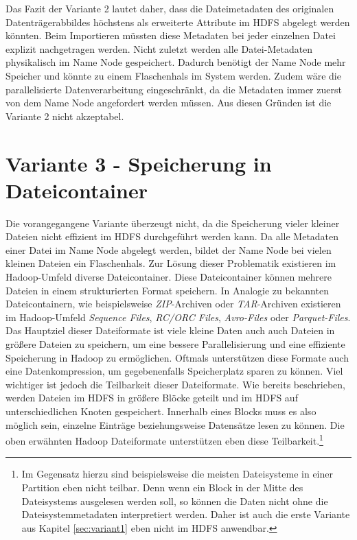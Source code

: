 \noindent
Das Fazit der Variante 2 lautet daher, dass die Dateimetadaten des originalen Datenträgerabbildes höchstens als erweiterte Attribute im HDFS abgelegt werden könnten. Beim Importieren müssten diese Metadaten bei jeder einzelnen Datei explizit nachgetragen werden. Nicht zuletzt werden alle Datei-Metadaten physikalisch im Name Node gespeichert. Dadurch benötigt der Name Node mehr Speicher und könnte zu einem Flaschenhals im System werden. Zudem wäre die parallelisierte Datenverarbeitung eingeschränkt, da die Metadaten immer zuerst von dem Name Node angefordert werden müssen. Aus diesen Gründen ist die Variante 2 nicht akzeptabel. 

\section{Variante 3 - Speicherung in Dateicontainer}

Die vorangegangene Variante überzeugt nicht, da die Speicherung vieler kleiner Dateien nicht effizient im HDFS durchgeführt werden kann. Da alle Metadaten einer Datei im Name Node abgelegt werden, bildet der Name Node bei vielen kleinen Dateien ein Flaschenhals. Zur Lösung dieser Problematik existieren im Hadoop-Umfeld diverse Dateicontainer. Diese Dateicontainer können mehrere Dateien in einem strukturierten Format speichern. In Analogie zu bekannten Dateicontainern, wie beispielsweise \textit{ZIP}-Archiven oder \textit{TAR}-Archiven existieren im Hadoop-Umfeld \textit{Sequence Files}, \textit{RC/ORC Files}, \textit{Avro-Files} oder \textit{Parquet-Files}.\cite[S. 296]{expert_hadoop_admin} \\
Das Hauptziel dieser Dateiformate ist viele kleine Daten auch auch Dateien in größere Dateien zu speichern, um eine bessere Parallelisierung und eine effiziente Speicherung in Hadoop zu ermöglichen. Oftmals unterstützen diese Formate auch eine Datenkompression, um gegebenenfalls Speicherplatz sparen zu können. Viel wichtiger ist jedoch die Teilbarkeit dieser Dateiformate. Wie bereits beschrieben, werden Dateien im HDFS in größere Blöcke geteilt und im HDFS auf unterschiedlichen Knoten gespeichert. Innerhalb eines Blocks muss es also möglich sein, einzelne Einträge beziehungsweise Datensätze lesen zu können. Die oben erwähnten Hadoop Dateiformate unterstützen eben diese Teilbarkeit.\footnote{Im Gegensatz hierzu sind beispielsweise die meisten Dateisysteme in einer Partition eben nicht teilbar. Denn wenn ein Block in der Mitte des Dateisystems ausgelesen werden soll, so können die Daten nicht ohne die Dateisystemmetadaten interpretiert werden. Daher ist auch die erste Variante aus Kapitel \ref{sec:variant1} eben nicht im HDFS anwendbar.}\\

